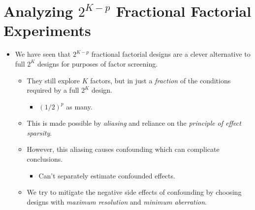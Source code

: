 \section{Analyzing \texorpdfstring{$ 2^{K-p} $}{2K-p} Fractional Factorial Experiments}
\begin{itemize}[*]
    \item We have seen that $2^{K-p}$ fractional factorial designs are a clever alternative to full $2^K$ designs for
          purposes of factor screening.
          \begin{itemize}
              \item They still explore $K$ factors, but in just a \emph{fraction} of the conditions required by a full $2^K$ design.
                    \begin{itemize}[$\hookrightarrow$]
                        \item $ (1/2)^p $ as many.
                    \end{itemize}
              \item This is made possible by \emph{aliasing} and reliance on the \emph{principle of effect sparsity}.
              \item However, this aliasing causes confounding which can complicate conclusions.
                    \begin{itemize}[$\hookrightarrow$]
                        \item Can't separately estimate confounded effects.
                    \end{itemize}
              \item We try to mitigate the negative side effects of confounding by choosing designs with \emph{maximum resolution} and \emph{minimum aberration}.
          \end{itemize}
\end{itemize}
